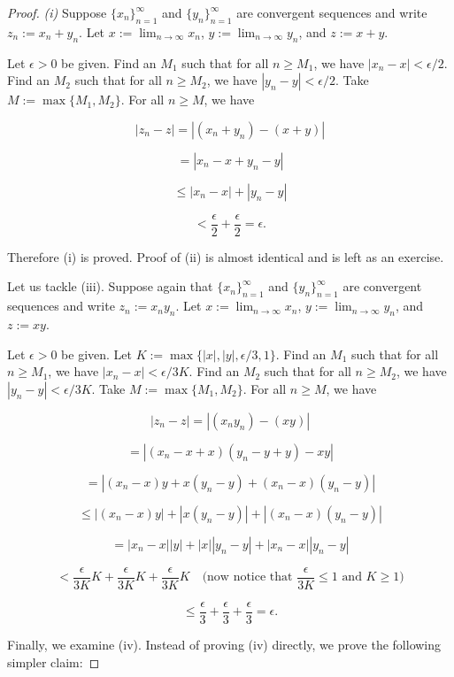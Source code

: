\documentclass[../main.tex]{subfiles}
\begin{document}
    
    \begin{proof}
\textit{(i)} Suppose $\{x_n\}_{n=1}^{\infty}$ and $\{y_n\}_{n=1}^{\infty}$ are convergent sequences and write
$z_n := x_n + y_n$. Let $x := \lim_{n \to \infty} x_n$, $y := \lim_{n \to \infty} y_n$, and $z := x + y$.

Let $\epsilon > 0$ be given. Find an $M_1$ such that for all $n \geq M_1$, we have $|x_n - x| < \epsilon/2$. Find an $M_2$ such that for all $n \geq M_2$, we have $|y_n - y| < \epsilon/2$. Take $M := \max\{M_1, M_2\}$. For all $n \geq M$, we have

\[
|z_n - z| = |(x_n + y_n) - (x + y)|
\]

\[
= |x_n - x + y_n - y|
\]

\[
\leq |x_n - x| + |y_n - y|
\]

\[
< \frac{\epsilon}{2} + \frac{\epsilon}{2} = \epsilon.
\]

Therefore (i) is proved. Proof of (ii) is almost identical and is left as an exercise.

Let us tackle (iii). Suppose again that $\{x_n\}_{n=1}^{\infty}$ and $\{y_n\}_{n=1}^{\infty}$ are convergent sequences and write $z_n := x_n y_n$. Let $x := \lim_{n \to \infty} x_n$, $y := \lim_{n \to \infty} y_n$, and $z := xy$.

Let $\epsilon > 0$ be given. Let $K := \max\{|x|, |y|, \epsilon/3, 1\}$. Find an $M_1$ such that for all $n \geq M_1$, we have $|x_n - x| < \epsilon/3K$. Find an $M_2$ such that for all $n \geq M_2$, we have $|y_n - y| < \epsilon/3K$. Take $M := \max\{M_1, M_2\}$. For all $n \geq M$, we have

\[
|z_n - z| = |(x_n y_n) - (xy)|
\]

\[
= |(x_n - x + x)(y_n - y + y) - xy|
\]

\[
= |(x_n - x)y + x(y_n - y) + (x_n - x)(y_n - y)|
\]

\[
\leq |(x_n - x)y| + |x(y_n - y)| + |(x_n - x)(y_n - y)|
\]

\[
= |x_n - x| |y| + |x| |y_n - y| + |x_n - x| |y_n - y|
\]

\[
< \frac{\epsilon}{3K} K + \frac{\epsilon}{3K} K + \frac{\epsilon}{3K} K
\quad \text{(now notice that } \frac{\epsilon}{3K} \leq 1 \text{ and } K \geq 1 \text{)}
\]

\[
\leq \frac{\epsilon}{3} + \frac{\epsilon}{3} + \frac{\epsilon}{3} = \epsilon.
\]

Finally, we examine (iv). Instead of proving (iv) directly, we prove the following simpler claim:


\end{proof}
\end{document}
